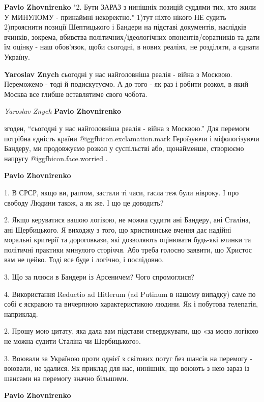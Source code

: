 \begin{itemize}
\begin{itemize}
\textbf{Pavlo Zhovnirenko} "2. Бути ЗАРАЗ з нинішніх позицій суддями тих, хто жили У МИНУЛОМУ - принаймні некоректно." 1)тут ніхто нікого НЕ судить 2)прояснити позиції Шептицького і Бандери на підставі документів, наслідків вчинків, зокрема, вбивства політичних/ідеологічних опонентів/соратників та дати їм оцінку - наш обов'язок, щоби сьогодні, в нових реаліях, не розділяти, а єднати Україну.

\textbf{Yaroslav Znych} сьогодні у нас найголовніша реалія - війна з Москвою. Переможемо - тоді й подискутуємо. А до того - як раз і робити розкол, в який Москва все глибше вставлятиме свого чобота.

\emph{Yaroslav Znych}
\textbf{Pavlo Zhovnirenko} 

згоден, \enquote{сьогодні у нас найголовніша реалія - війна з Москвою.} Для перемоги
потрібна єдність країни @igg{fbicon.exclamation.mark} Героїзуючи і міфологізуючи Бандеру, ми продовжуємо
розкол у суспільстві або, щонайменше, створюємо напругу  @igg{fbicon.face.worried} .

\textbf{Pavlo Zhovnirenko} 

1. В СРСР, якщо ви, раптом, застали ті часи, гасла теж були нівроку. І про
свободу Людини також, а як же. І що це доводить?

2. Якщо керуватися вашою логікою, не можна судити ані Бандеру, ані Сталіна, ані
Щербицького. Я виходжу з того, що християнське вчення дає надійні моральні
критерії та дороговкази, які дозволяють оцінювати будь-які вчинки та політичні
практики минулого сторіччя. Або треба голосно заявити, що Христос вам не цейво.
Тоді все буде і логічно, і послідовно.

3. Що за плюси в Бандери із Арсеничем? Чого спромоглися?

4. Використання Reductio ad Hitlerum (ad Putinum в нашому випадку) саме по собі
є яскравою та вичерпною характеристикою людини. Як і побутова телепатія,
наприклад.


2. Прошу мою цитату, яка дала вам підстави стверджувати, що «за моєю логікою не
можна судити Сталіна чи Щербицького».

3. Воювали за Україною проти однієї з світових потуг без шансів на перемогу -
воювали, не здалися. Як приклад для нас, нинішніх, що воюють з нею зараз із
шансами на перемогу значно більшими.


\textbf{Pavlo Zhovnirenko} 


\end{itemize}
\end{itemize}
